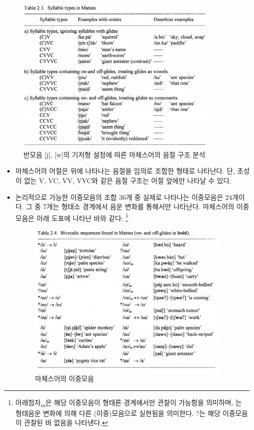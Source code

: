 \begin{figure}
	\centering
		\includegraphics[width=100mm]{Matses/src/matses2.png}
		\caption{반모음 [j], [w]의 기저형 설정에 따른 마체스어의 음절 구조 분석}
\end{figure}

\begin{itemize}
\item 마체스어의 어절은 위에 나타나는 음절을 임의로 조합한 형태로 나타난다. 단, 초성이 없는 V, VC, VV, VVC와 같은 음절 구조는 어절 앞에만 나타날 수 있다. 
\item 논리적으로 가능한 이중모음의 조합 36개 중 실제로 나타나는 이중모음은 24개이다. 그 중 7개는 형태소 경계에서 음운 변화를 통해서만 나타난다. 마체스어의 이중모음은 아래 도표에 나타난 바와 같다:
\footnote{아래첨자\textsubscript{m}은 해당 이중모음이 형태론 경계에서만 관찰이 가능함을 의미하며, \*는 형태음운 변화에 의해 다른 (이중)모음으로 실현됨을 의미한다. ?는 해당 이중모음이 관찰된 바 없음을 나타낸다.}

\begin{figure}
	\centering
		\includegraphics[width=100mm]{Matses/src/matses3.png}
		\caption{마체스어의 이중모음}
\end{figure}
\end{itemize}

